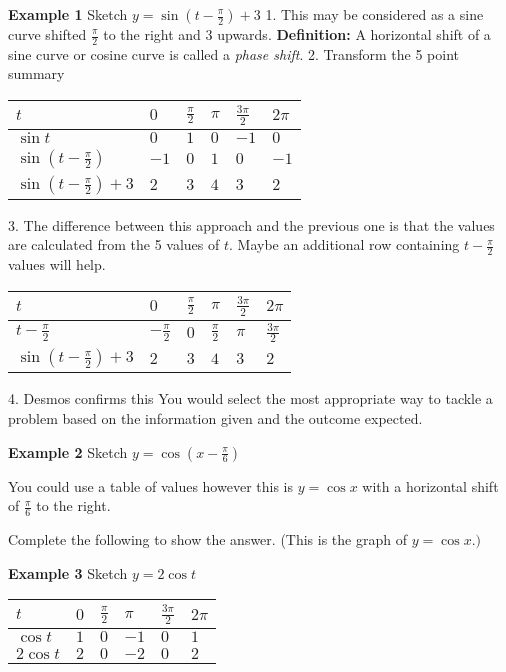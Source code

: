 \textbf{Example 1}
Sketch $y =\sin  \left (t -\frac{\pi }{2}\right ) +3$ 
1. This may be considered as a sine curve shifted $\frac{\pi }{2}$ to the right and $3$ upwards. 
\textbf{Definition:} A horizontal shift of a sine curve or cosine curve is called a \emph{phase shift}. 
2. Transform the 5 point summary 
\begin{tabular}[c]{|l|l|l|l|l|l|}\hline
	$t$  & $0$  & $\frac{\pi }{2}$  & $\pi $  & $\frac{3 \pi }{2}$  & $2 \pi $  \\
	\hline
	$\sin  t$  & $0$  & $1$  & $0$  & $ -1$  & $0$  \\
	\hline
	$\sin  \left (t -\frac{\pi }{2}\right )$  & $ -1$  & $0$  & $1$  & $0$  & $ -1$  \\
	\hline
	$\sin  \left (t -\frac{\pi }{2}\right ) +3$  & $2$  & $3$  & $4$  & $3$  & $2$  \\
	\hline
\end{tabular}
3. The difference between this approach and the previous one is that the values are calculated
from the 5 values of $t$. Maybe an additional row containing $t -\frac{\pi }{2}$ values will help. 
\begin{tabular}[c]{|l|l|l|l|l|l|}\hline
	$t$  & $0$  & $\frac{\pi }{2}$  & $\pi $  & $\frac{3 \pi }{2}$  & $2 \pi $  \\
	\hline
	$t -\frac{\pi }{2}$  & $ -\frac{\pi }{2}$  & $0$  & $\frac{\pi }{2}$  & $\pi $  & $\frac{3 \pi }{2}$  \\
	\hline
	$\sin  \left (t -\frac{\pi }{2}\right ) +3$  & $2$  & $3$  & $4$  & $3$  & $2$  \\
	\hline
\end{tabular}
4. Desmos confirms this 
\setlength\fboxrule{0.01in}\setlength\fboxsep{0.2in}
You would select the most appropriate way to tackle a problem based on the information given and the outcome expected. 

\textbf{Example 2} Sketch $y =\cos  (x -\frac{\pi }{6})$ 

You could use a table of values however this is $y =\cos  x$ with a horizontal shift of $\frac{\pi }{6}$ to the right. 

Complete the following to show the answer. (This is the graph of $y =\cos  x .)$ 


\setlength\fboxrule{0.01in}\setlength\fboxsep{0.2in}

\textbf{Example 3} Sketch $y =2 \cos  t$ \\
\begin{tabular}[c]{|l|l|l|l|l|l|}\hline
	$t$  & $0$  & $\frac{\pi }{2}$  & $\pi $  & $\frac{3 \pi }{2}$  & $2 \pi $  \\
	\hline
	$\cos  t$  & $1$  & $0$  & $ -1$  & $0$  & $1$  \\
	\hline
	$2 \cos  t$  & $2$  & $0$  & $ -2$  & $0$  & $2$  \\
	\hline
\end{tabular}

